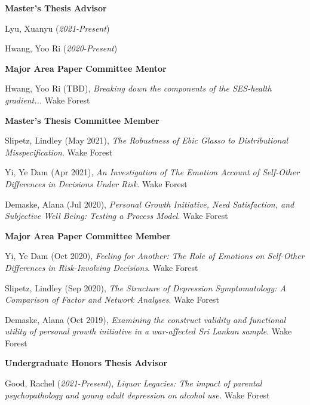 {\large\textbf{Master's Thesis Advisor}}
\begin{etaremune}%
\item Lyu, Xuanyu  (\textit{2021-Present})
\item Hwang, Yoo Ri (\textit{2020-Present})
\end{etaremune}%


{\large\textbf{Major Area Paper Committee Mentor}}
\begin{etaremune}%

\item Hwang, Yoo Ri (TBD), \textit{Breaking  down  the  components  of  the  SES-health  gradient...} Wake Forest%

\end{etaremune}%
%
{\large\textbf{Master's Thesis Committee Member}}
\begin{etaremune}%
\item  Slipetz, Lindley (May 2021), \textit{The Robustness of Ebic Glasso to Distributional Misspecification}. Wake Forest
\item Yi, Ye Dam (Apr 2021), \textit{An Investigation of The Emotion Account of Self-Other Differences in Decisions Under Risk}. Wake Forest
\item Demaske, Alana (Jul 2020), \textit{Personal Growth Initiative, Need Satisfaction, and Subjective Well Being: Testing a Process Model}. Wake Forest%
\end{etaremune}%
%

{\large\textbf{Major Area Paper Committee Member}}
\begin{etaremune}%

\item Yi, Ye Dam (Oct 2020), \textit{Feeling for Another: The Role of Emotions on Self-Other Differences in Risk-Involving Decisions}. Wake Forest%
\item Slipetz, Lindley (Sep 2020), \textit{The Structure of Depression Symptomatology: A Comparison of Factor and Network Analyses}. Wake Forest%
\item Demaske, Alana (Oct 2019), \textit{Examining the construct validity and functional utility of personal growth initiative in a war-affected Sri Lankan sample}. Wake Forest%
\end{etaremune}%
%
{\large\textbf{Undergraduate Honors Thesis Advisor}}
\begin{etaremune}%
\item Good, Rachel (\textit{2021-Present}), \textit{Liquor Legacies: The impact of parental psychopathology and young adult depression on alcohol use.} Wake Forest%
\end{etaremune}%


